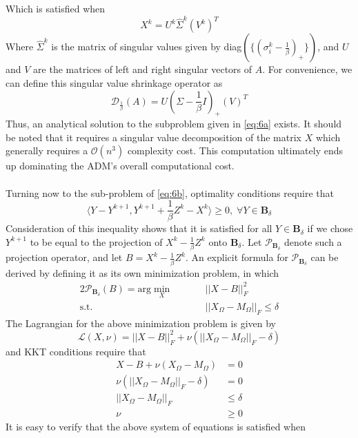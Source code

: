 \documentclass{article}
\begin{document}
Which is satisfied when
\begin{equation} \label{eq:9}
X^k = U^k \hat{\Sigma}^k (V^k)^T
\end{equation}
Where $\hat{\Sigma}^k$ is the matrix of singular values given by diag$( \{ ( \sigma_i^k - \frac 1 \beta)_+ \} )$, and $U$ and $V$ are the matrices of left and right singular vectors of $A$.  For convenience, we can define this singular value shrinkage operator as
$$
\mathcal{D}_{\frac 1 \beta}(A) = U(\Sigma - \frac 1 \beta I)_+(V)^T
$$
Thus, an analytical solution to the subproblem given in \ref{eq:6a} exists.  It should be noted that it requires a singular value decomposition of the matrix $X$ which generally requires a $\mathcal{O}(n^3)$ complexity cost.  This computation ultimately ends up dominating the ADM's overall computational cost.  
\\\\
Turning now to the sub-problem of \ref{eq:6b}, optimality conditions require that
\begin{equation} \label{eq:10}
\langle Y - Y^{k+1}, Y^{k+1} + \frac 1 \beta Z^k - X^k \rangle \ge 0, \; \forall Y \in \textbf{B}_\delta
\end{equation}
Consideration of this inequality shows that it is satisfied for all $Y \in \textbf{B}_\delta$ if we chose $Y^{k+1}$ to be equal to the projection of $X^k - \frac 1 \beta Z^k$  onto $\textbf{B}_\delta$.  Let $\mathcal{P}_{\textbf{B}_\delta}$ denote such a projection operator, and let $B = X^k - \frac 1 \beta Z^k$.  An explicit formula for $\mathcal{P}_{\textbf{B}_\delta}$ can be derived by defining it as its own minimization problem, in which
\begin{alignat}{2} \label{eq:11}
\mathcal{P}_{\textbf{B}_\delta}({B}) = \textrm{arg} \min_X & \quad &&||X-B||^2_F \\
\textrm{s.t.}& && ||X_\Omega - M_\Omega||_F \le \delta \nonumber
\end{alignat}
The Lagrangian for the above minimization problem is given by 
$$
\mathcal{L}(X, \nu) = ||X - B||^2_F + \nu ( ||X_\Omega - M_\Omega||_F - \delta)
$$
and KKT conditions require that
\begin{align*}
X - B + \nu(X_\Omega - M_\Omega) &= 0 \\
\nu ( ||X_\Omega - M_\Omega||_F - \delta) &= 0 \\
||X_\Omega - M_\Omega||_F &\le \delta \\
\nu &\ge 0
\end{align*} 
 It is easy to verify that the above system of equations is satisfied when
\end{document}
